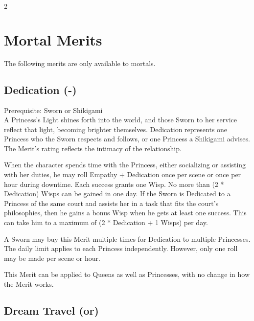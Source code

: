 \begin{multicols}{2}
\section*{Mortal Merits}

The following merits are only available to mortals. 

\subsection*{Dedication (\textbullet\nobreak\hspace{.16667em}-\nobreak\hspace{.16667em}\textbullet\textbullet\textbullet\textbullet\textbullet)}

Prerequisite: Sworn or Shikigami \\

\noindent A Princess's Light shines forth into the world, and those Sworn to her service reflect that light, becoming brighter themselves. Dedication represents one Princess who the Sworn respects and follows, or one Princess a Shikigami advises. The Merit's rating reflects the intimacy of the relationship. 

When the character spends time with the Princess, either socializing or assisting with her duties, he may roll Empathy + Dedication once per scene or once per hour during downtime. Each success grants one Wisp. No more than (2 * Dedication) Wisps can be gained in one day. If the Sworn is Dedicated to a Princess of the same court and assists her in a task that fits the court's philosophies, then he gains a bonus Wisp when he gets at least one success. This can take him to a maximum of (2 * Dedication + 1 Wisps) per day.

A Sworn may buy this Merit multiple times for Dedication to multiple Princesses. The daily limit applies to each Princess independently. However, only one roll may be made per scene or hour. 

This Merit can be applied to Queens as well as Princesses, with no change in how the Merit works.

\subsection*{Dream Travel (\textbullet\nobreak\hspace{.16667em}or\nobreak\hspace{.16667em}\textbullet\textbullet\textbullet)}


\end{multicols}
